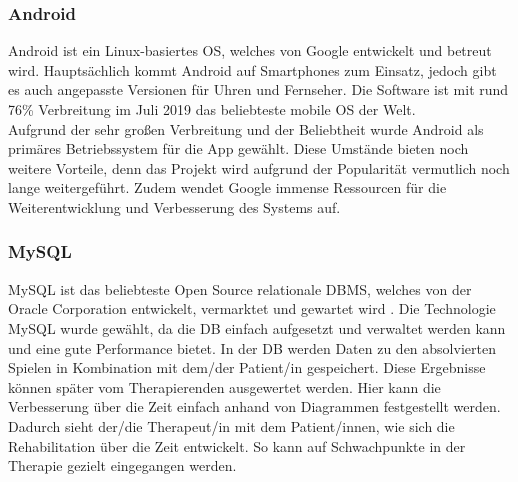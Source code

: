 \subsubsection{Android} \label{tec:android}
Android ist ein Linux-basiertes \ac{OS}, welches von Google entwickelt und betreut wird. Hauptsächlich kommt Android auf Smartphones zum Einsatz, jedoch gibt es auch angepasste Versionen für Uhren und Fernseher. Die Software ist mit rund 76\% Verbreitung im Juli 2019 das beliebteste mobile \ac{OS} der Welt.
\cite{android:2019}\cite{android:marketshare:2019} \\
Aufgrund der sehr großen Verbreitung und der Beliebtheit wurde Android als primäres Betriebssystem für die App gewählt. Diese Umstände bieten noch weitere Vorteile, denn das Projekt wird aufgrund der Popularität vermutlich noch lange weitergeführt. Zudem wendet Google immense Ressourcen für die Weiterentwicklung und Verbesserung des Systems auf.


\subsubsection{MySQL} \label{tec:mysql}
MySQL ist das beliebteste Open Source relationale \ac{DBMS}, welches von der Oracle Corporation entwickelt, vermarktet und gewartet wird \cite{mysql:2019}. Die Technologie MySQL wurde gewählt, da die \ac{DB} einfach aufgesetzt und verwaltet werden kann und eine gute Performance bietet. In der \acl{DB} werden Daten zu den absolvierten Spielen in Kombination mit dem/der Patient/in gespeichert. Diese Ergebnisse können später vom Therapierenden ausgewertet werden. Hier kann die Verbesserung über die Zeit einfach anhand von Diagrammen festgestellt werden. Dadurch sieht der/die Therapeut/in mit dem Patient/innen, wie sich die Rehabilitation über die Zeit entwickelt. So kann auf Schwachpunkte in der Therapie gezielt eingegangen werden.